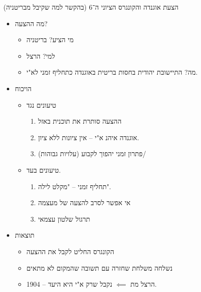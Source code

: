 \documentclass[]{article}
\begin{document}
	הצעת אוגנדה והקונגרס הציוני ה־6 (בהקשר למה שקיבל מבריטניה)
	\begin{multicols}{2}
		\begin{itemize}
			\item מה ההצעה? 
			\begin{itemize}
				\item מי הציע? בריטניה
				\item למי? הרצל
				\item מה? התיישובת יהודית בחסות בריטית באוגנדה כתחליף זמני לא"י. 
			\end{itemize}
			\item הויכוח
			\begin{itemize}
				\item טיעונים נגד
				\begin{enumerate}
					\item ההצעה סותרת את תוכנית באזל
					\item אוגנדה איהנ א"י – אין ציונות ללא ציון. 
					\item פתרון זמני יהפוך לקבוע (עלויות גבוהות)/ 
				\end{enumerate}
				\item טיעונים בעד. 
				\begin{enumerate}
					\item תחליף זמני – "מקלט לילה". 
					\item אי אפשר לסרב להצעה של מעצמה
					\item תרגול שלטון עצמאי
				\end{enumerate}
			\end{itemize}
			\item תוצאות
			\begin{itemize}
				\item הקונגרס החליט לקבל את ההצעה
				\item נשלחה משלחת שחזרה עם תשובה שהמקום לא מתאים
				\item 1904 – הרצל מת $\impliedby$ נקבל שרק א"י היא היעד. 
			\end{itemize}
		\end{itemize}
	\end{multicols}
\end{document}
